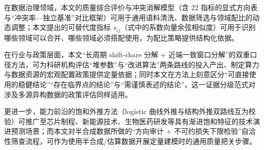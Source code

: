 在数据治理领域，本文的质量综合评价与冲突消解模型（含 22 指标的显式方向表与“冲突率—独立基准”对比框架）可用于通用语料清洗、数据筛选与领域配比的动态调整；本文提出的可替代度指标 $s_{ij}$（式中的系数向量余弦相似度）可用于识别哪些领域可以合并、哪些领域必须搭配使用，为配比策略提供结构化依据。

在行业与政策层面，本文“长周期 shift-share 分解 + 近端一致窗口分解”的双重口径方法，可为科研机构评估“堆参数”与“改进算法”两条路线的投入产出、制定算力与数据资源的宏观配置政策提供定量依据；同时本文在方法上刻意区分“可直接使用的稳健结论”“存在临界点的结论”与“需谨慎表述的结论”，这一证据分级范式对涉及多源异构数据的政策评估同样适用。

更进一步，能力前沿的饱和外推方法（logistic 曲线外推与结构外推双路线互为校验）可推广至芯片制程、新能源技术、生物医药研发等具有渐进饱和特征的技术演进预测场景；而本文对半合成数据所做的“方向审计 + 不可约损失下限检验”自洽性筛查流程，可作为使用半合成/估算数据开展定量建模时的通用质量把关步骤。
